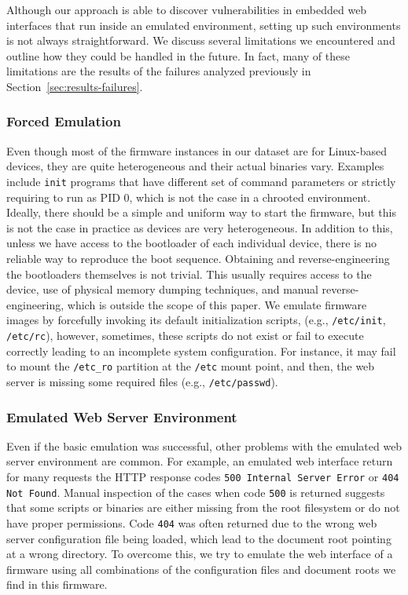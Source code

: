 \documentclass[conference]{./templates/ndss/IEEEtran}
\newcounter{t0d0_counter}
\newcounter{pr00f_counter}
\begin{document}
Although our approach is able to discover vulnerabilities in embedded web interfaces 
that run inside an emulated environment, setting up such environments is not always
straightforward. We discuss several limitations we encountered and 
outline how they could be handled in the future.
In fact, many of these limitations are the results of the failures 
analyzed previously in Section~\ref{sec:results-failures}. 

\subsubsection{Forced Emulation}
\label{sec:discuss-forcedemulation}

Even though most of the firmware instances in our dataset are for Linux-based devices, they are 
quite heterogeneous and their actual binaries vary. Examples include 
\texttt{init} programs that have different set of command parameters or strictly 
requiring to run as PID 0, which is not the case in a chrooted environment.
Ideally, there should be a simple and uniform way to start the firmware, but this is not the case in practice 
as devices are very heterogeneous. In addition to this, unless we have access to the 
bootloader of each individual device, there is no 
reliable way to reproduce the boot sequence. Obtaining and 
reverse-engineering the bootloaders themselves is not trivial. This usually 
requires access to the device, use of physical memory dumping techniques, and 
manual reverse-engineering, which is outside the scope of this paper. 
We emulate firmware images by forcefully invoking its default
initialization scripts, (e.g., \texttt{/etc/init}, \texttt{/etc/rc}),
however, sometimes, these scripts do not exist or fail to execute correctly 
leading to an incomplete  system configuration.
For instance, it may fail to mount the \texttt{/etc\_ro} partition at
the \texttt{/etc} mount point, and then, the web server is missing some
required files (e.g., \texttt{/etc/passwd}).



\subsubsection{Emulated Web Server Environment}
\label{sec:discuss-emulatedwebserverenv}

Even if the basic emulation was successful, other problems
with the emulated web server environment are common. 
For example, an emulated web interface return for 
many requests the HTTP response codes 
\texttt{500 Internal Server Error} or \texttt{404 Not Found}. 
Manual inspection of the cases when code \texttt{500} is returned suggests that 
some scripts or binaries are either missing from the root filesystem or 
do not have proper permissions. 
Code \texttt{404} was often returned due to the wrong  
web server configuration file being loaded, which lead to  
the document root pointing at a wrong directory. To 
overcome this, we try to emulate the web interface of a firmware using 
all combinations of the configuration files and document roots 
we find in this firmware. 
\end{document}
